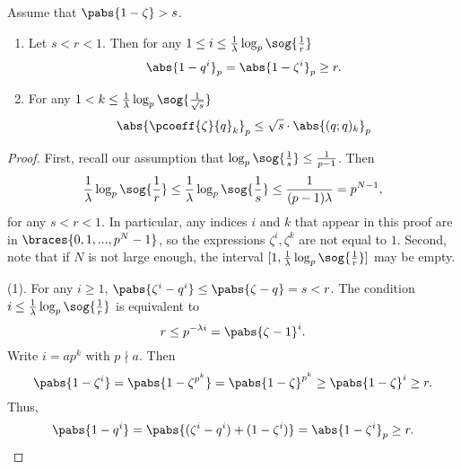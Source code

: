 \begin{prop}\label{some_p_adic_valuations}
Assume that $\pabs{1-\zeta}>s$.
    \begin{enumerate}
    \item Let $ s< r<1$.
    Then for any $1\leq i\leq\frac{1}{\lambda}\log_p\sog{\frac{1}{r}}$ 
    \[\abs{1-q^i}_p=\abs{1-\zeta^i}_p\geq r.\]
    \item For any $1<k\leq\frac{1}{\lambda}\log_p\sog{\frac{1}{\sqrt{s}}}$ 
    \[\abs{\pcoeff{\zeta}{q}_k}_p\leq \sqrt{s}\cdot\abs{(q;q)_k}_p\]
    \end{enumerate}
\end{prop} 
    \begin{proof}
    First, recall our assumption that $\log_p\sog{\frac{1}{s}}\leq\frac{1}{p-1}$.
    Then 
    \[\frac{1}{\lambda}\log_p\sog{\frac{1}{r}}\leq \frac{1}{\lambda}\log_p\sog{\frac{1}{s}}\leq \frac{1}{(p-1)\lambda}=p^{N-1},\]
    for any $s<r<1$.
    In particular, any indices $i$ and $k$ that appear in this proof are in $\braces{0,1,...,p^N-1}$, so the expressions $\zeta^i, \zeta^k$ are not equal to $1$.
    Second, note that if $N$ is not large enough, the interval $[1,\frac{1}{\lambda}\log_p\sog{\frac{1}{r}}]$ may be empty.
        
    (1). For any $i\geq 1$, $\pabs{\zeta^i-q^i}\leq \pabs{\zeta-q}=s< r$.
    The condition $i\leq\frac{1}{\lambda}\log_p\sog{\frac{1}{r}}$ is equivalent to
    \[r\leq p^{-\lambda i}=\pabs{\zeta-1}^i.\]
    Write $i=ap^k$ with $p\nmid a$. Then
    \[\pabs{1-\zeta^i}=\pabs{1-\zeta^{p^k}}=\pabs{1-\zeta}^{p^k}\geq \pabs{1-\zeta}^i\geq r.\]
    Thus,
    \[\pabs{1-q^i}=\pabs{(\zeta^i-q^i)+(1-\zeta^i)}=\abs{1-\zeta^i}_p\geq r.\]
    

\end{proof}
